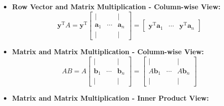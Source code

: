 \documentclass{article}
\begin{document}
\begin{itemize}
    \item \textbf{Row Vector and Matrix Multiplication - Column-wise View:}
    \begin{equation}
        \mathbf{y}^{\mathrm{T}} A =
        \mathbf{y}^{\mathrm{T}}
        \left[
            \begin{array}{ccc}
                | &        & | \\
                \mathbf{a}_1 & \cdots & \mathbf{a}_n \\
                | &        & |
            \end{array}
        \right]
        =
        \left[
            \begin{array}{ccc}
                \mathbf{y}^{\mathrm{T}}\mathbf{a}_1 & \cdots & \mathbf{y}^{\mathrm{T}}\mathbf{a}_n
            \end{array}
        \right]
        \label{eq:rowvecmat_col}
    \end{equation}

    \item \textbf{Matrix and Matrix Multiplication - Column-wise View:}
    \begin{equation}
        A B = A
        \left[
            \begin{array}{ccc}
                | &        & | \\
                \mathbf{b}_1 & \cdots & \mathbf{b}_n \\
                | &        & |
            \end{array}
        \right]
        =
        \left[
            \begin{array}{ccc}
                | &        & | \\
                A\mathbf{b}_1 & \cdots & A\mathbf{b}_n \\
                | &        & |
            \end{array}
        \right]
        \label{eq:mul_colwise}
    \end{equation}

    \item \textbf{Matrix and Matrix Multiplication - Inner Product View:}


\end{itemize}
\end{document}
